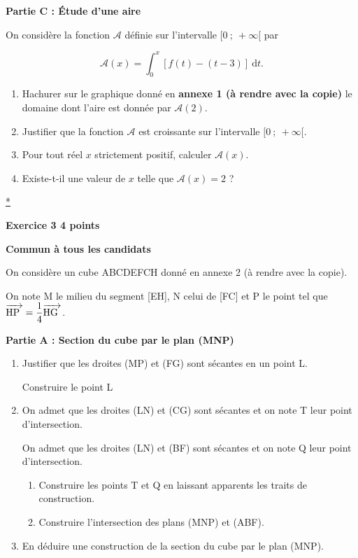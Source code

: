 \documentclass[10pt]{article}
\newcommand{\vect}[1]{\mathchoice%
{\overrightarrow{\displaystyle\mathstrut#1\,\,}}%
{\overrightarrow{\textstyle\mathstrut#1\,\,}}%
{\overrightarrow{\scriptstyle\mathstrut#1\,\,}}%
{\overrightarrow{\scriptscriptstyle\mathstrut#1\,\,}}}
\begin{document}
\bigskip
 
\textbf{Partie C : Étude d'une aire}

\medskip
 
On considère la fonction $\mathcal{A}$ définie sur l'intervalle $[0~;~+\infty[$ par 

\[\mathcal{A}(x) = \displaystyle\int_{0}^x [f(t) - (t - 3)]\: \text{d}t.\]

\medskip
 
\begin{enumerate}
\item Hachurer sur le graphique donné en \textbf{annexe 1 (à rendre avec la copie)} le domaine dont l'aire est donnée par $\mathcal{A}(2)$. 
\item Justifier que la fonction $\mathcal{A}$ est croissante sur l'intervalle $[0~;~+\infty[$. 
\item Pour tout réel $x$ strictement positif, calculer $\mathcal{A}(x)$. 
\item Existe-t-il une valeur de $x$ telle que $\mathcal{A}(x) = 2$ ? 
\end{enumerate}

\hyperlink{Index}{*}
\vspace{0,5cm}

\textbf{Exercice 3 \hfill  4 points}

\textbf{Commun à  tous les candidats}

\medskip

On considère un cube ABCDEFCH donné en annexe 2 (à rendre avec la copie). 
 
On note M le milieu du segment [EH], N celui de [FC] et P le point tel que $\vect{\text{HP}}  = \dfrac{1}{4} \vect{\text{HG}}$. 

\medskip
 
\textbf{Partie A : Section du cube par le plan (MNP)}

\medskip
 
\begin{enumerate}
\item Justifier que les droites (MP) et (FG) sont sécantes en un point L.
 
Construire le point L 
\item On admet que les droites (LN) et (CG) sont sécantes et on note T leur point d'intersection.
 
On admet que les droites (LN) et (BF) sont sécantes et on note Q leur point d'intersection. 
	\begin{enumerate}
		\item Construire les points T et Q en laissant apparents les traits de construction. 
		\item Construire l'intersection des plans (MNP) et (ABF).
	\end{enumerate} 
\item En déduire une construction de la section du cube par le plan (MNP).
\end{enumerate}
\end{document}
